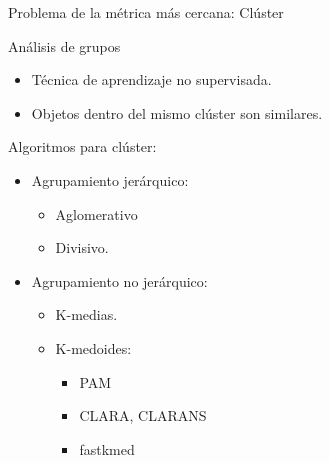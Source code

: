 \documentclass[10pt]{beamer}
\begin{document}
\begin{frame}{Problema de la métrica más cercana: Clúster}

\begin{block}{Análisis de grupos}
\begin{itemize}
    \item Técnica de aprendizaje no supervisada.
    \item Objetos dentro del mismo clúster son similares.
\end{itemize}
\end{block}

\begin{block}{Algoritmos para clúster:}
\begin{itemize}
    \item Agrupamiento jerárquico:
    \begin{itemize}
        \item Aglomerativo
        \item Divisivo.
    \end{itemize}
    \item Agrupamiento no jerárquico:
    \begin{itemize}
        \item K-medias.
        \item K-medoides:
        \begin{itemize}
            \item PAM
            \item CLARA, CLARANS
            \item \alert{fastkmed}
        \end{itemize}
    \end{itemize}
\end{itemize}
\end{block}

    
\end{frame}
\end{document}
